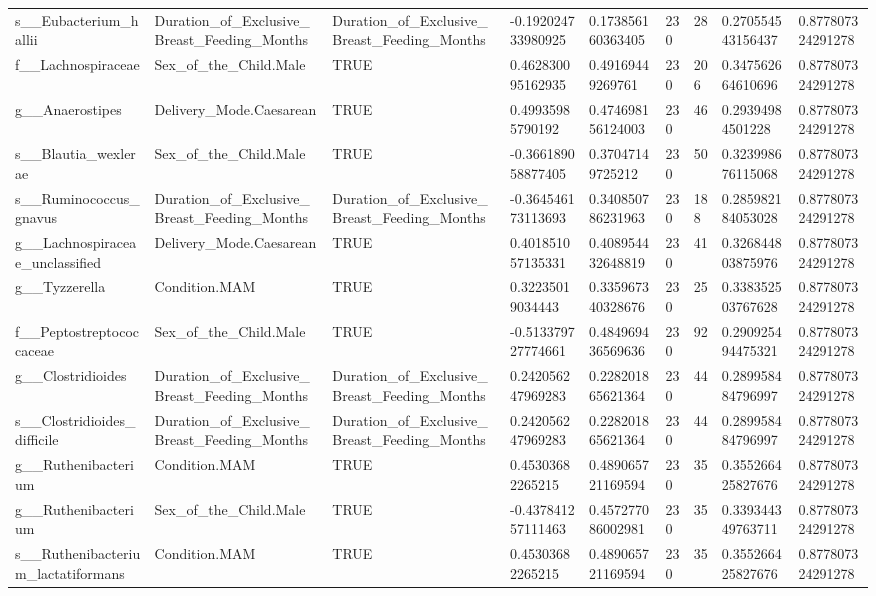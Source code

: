 \begin{longtable}{lllllllll}
s\_\_Eubacterium\_hallii & Duration\_of\_Exclusive\_Breast\_Feeding\_Months & Duration\_of\_Exclusive\_Breast\_Feeding\_Months & -0.192024733980925 & 0.173856160363405 & 230 & 28 & 0.270554543156437 & 0.877807324291278 \\
f\_\_Lachnospiraceae & Sex\_of\_the\_Child.Male & TRUE & 0.462830095162935 & 0.49169449269761 & 230 & 206 & 0.347562664610696 & 0.877807324291278 \\
g\_\_Anaerostipes & Delivery\_Mode.Caesarean & TRUE & 0.49935985790192 & 0.474698156124003 & 230 & 46 & 0.29394984501228 & 0.877807324291278 \\
s\_\_Blautia\_wexlerae & Sex\_of\_the\_Child.Male & TRUE & -0.366189058877405 & 0.37047149725212 & 230 & 50 & 0.323998676115068 & 0.877807324291278 \\
s\_\_Ruminococcus\_gnavus & Duration\_of\_Exclusive\_Breast\_Feeding\_Months & Duration\_of\_Exclusive\_Breast\_Feeding\_Months & -0.364546173113693 & 0.340850786231963 & 230 & 188 & 0.285982184053028 & 0.877807324291278 \\
g\_\_Lachnospiraceae\_unclassified & Delivery\_Mode.Caesarean & TRUE & 0.401851057135331 & 0.408954432648819 & 230 & 41 & 0.326844803875976 & 0.877807324291278 \\
g\_\_Tyzzerella & Condition.MAM & TRUE & 0.32235019034443 & 0.335967340328676 & 230 & 25 & 0.338352503767628 & 0.877807324291278 \\
f\_\_Peptostreptococcaceae & Sex\_of\_the\_Child.Male & TRUE & -0.513379727774661 & 0.484969436569636 & 230 & 92 & 0.290925494475321 & 0.877807324291278 \\
g\_\_Clostridioides & Duration\_of\_Exclusive\_Breast\_Feeding\_Months & Duration\_of\_Exclusive\_Breast\_Feeding\_Months & 0.242056247969283 & 0.228201865621364 & 230 & 44 & 0.289958484796997 & 0.877807324291278 \\
s\_\_Clostridioides\_difficile & Duration\_of\_Exclusive\_Breast\_Feeding\_Months & Duration\_of\_Exclusive\_Breast\_Feeding\_Months & 0.242056247969283 & 0.228201865621364 & 230 & 44 & 0.289958484796997 & 0.877807324291278 \\
g\_\_Ruthenibacterium & Condition.MAM & TRUE & 0.45303682265215 & 0.489065721169594 & 230 & 35 & 0.355266425827676 & 0.877807324291278 \\
g\_\_Ruthenibacterium & Sex\_of\_the\_Child.Male & TRUE & -0.437841257111463 & 0.457277086002981 & 230 & 35 & 0.339344349763711 & 0.877807324291278 \\
s\_\_Ruthenibacterium\_lactatiformans & Condition.MAM & TRUE & 0.45303682265215 & 0.489065721169594 & 230 & 35 & 0.355266425827676 & 0.877807324291278 \\

\end{longtable}
